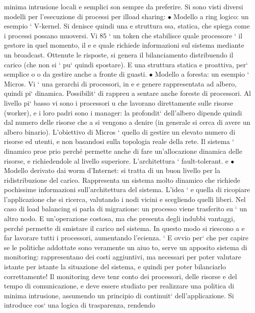 \documentclass[a4paper,12pt]{article}
\begin{document}
minima intrusione locali e semplici son sempre da preferire.
Si sono visti diversi modelli per l'esecuzione di processi per ilload sharing:
$\bullet$ Modello a ring logico: un esempio ` V-kernel. Si denisce quindi una
e
struttura ssa, statica, che spiega come i processi possano muoversi. Vi
85
` un token che stabilisce quale processore ` il gestore in quel momento, il
e
e
quale richiede informazioni sul sistema mediante un broadcast. Ottenute
le risposte, si genera il bilanciamento distribuendo il carico (che non si
`
pu` quindi spostare). E una struttura statica e proattiva, per` semplice
o
o
da gestire anche a fronte di guasti.
$\bullet$ Modello a foresta: un esempio ` Micros. Vi ` una gerarchi di processori, in
e
e
genere rappresentata ad albero, quindi pi` dinamica. Possibilit` di rappreu
a
sentare anche foreste di processori. Al livello pi` basso vi sono i processori
u
che lavorano direttamente sulle risorse (worker), e i loro padri sono i manager: la profondit` dell'albero dipende
quindi dal numero delle risorse che
a
si vengono a denire (in generale si cerca di avere un albero binario). L'obiettivo di Micros ` quello di gestire un
elevato numero di risorse ed utenti,
e
non basandosi sulla topologia reale della rete. Il sistema ` dinamico proe
prio perché permette anche di fare un'allocazione dinamica delle risorse,
e
richiedendole al livello superiore. L'architettura ` fault-tolerant.
e
$\bullet$ Modello derivato dai worm d'Internet: si tratta di un buon livello per
la ridistribuzione del carico. Rappresenta un sistema molto dinamico che
richiede pochissime informazioni sull'architettura del sistema. L'idea `
e
quella di ricopiare l'applicazione che si ricerca, valutando i nodi vicini e
scegliendo quelli liberi.
Nel caso di load balancing si parla di migrazione: un processo viene trasferito su
`
un altro nodo. E un'operazione costosa, ma che presenta degli indubbi vantaggi,
perché permette di smistare il carico nel sistema. In questo modo si riescono a
e
far lavorare tutti i processori, aumentando l'ecienza.
`
E ovvio per` che per capire se le politiche addottate sono veramente un aiuo
to, serve un apposito sistema di monitoring: rappresentano dei costi aggiuntivi,
ma necessari per poter valutare istante per istante la situazione del sistema, e
quindi per poter bilanciarlo correttamente! Il monitoring deve tenr conto dei
processori, delle risorse e del tempo di comunicazione, e deve essere studiato per
realizzare una politica di minima intrusione, assumendo un principio di continuit` dell'applicazione. Si introduce cos`
una logica di trasparenza, rendendo
\end{document}
